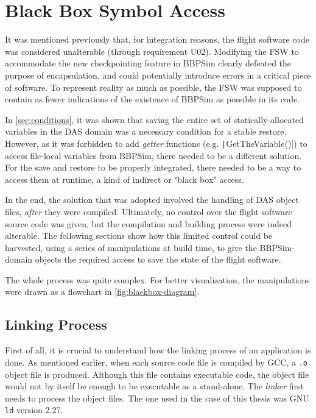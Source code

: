 {
\setlength{\parindent}{2em}
\section{Black Box Symbol Access}\label{sec:das-mem-restore}
It was mentioned previously that, for integration reasons, the flight software code was considered unalterable (through requirement U02). Modifying the \gls{FSW} to accommodate the new checkpointing feature in BBPSim clearly defeated the purpose of encapsulation, and could potentially introduce errors in a critical piece of software. To represent reality as much as possible, the FSW was supposed to contain as fewer indications of the existence of \gls{BBPSim} as possible in its code.

In \autoref{sec:conditions}, it was shown that saving the entire set of statically-allocated variables in the DAS domain was a necessary condition for a stable restore. However, as it was forbidden to add \textit{getter} functions (e.g. \texttt|GetTheVariable()|) to access file-local variables from BBPSim, there needed to be a different solution. For the save and restore to be properly integrated, there needed to be a way to access them at runtime, a kind of indirect or "black box" access. 

In the end, the solution that was adopted involved the handling of DAS object files, \textit{after} they were compiled. Ultimately, no control over the flight software source code was given, but the compilation and building process were indeed alterable. The following sections show how this limited control could be harvested, using a series of manipulations at build time, to give the \gls{BBPSim}-domain objects the required access to save the state of the flight software.

The whole process was quite complex. For better visualization, the manipulations were drawn as a flowchart in \autoref{fig:blackbox-diagram}.

\subsection*{Linking Process}
First of all, it is crucial to understand how the linking process of an application is done. As mentioned earlier, when each source code file is compiled by \gls{GCC}, a \texttt{.o} object file is produced. Although this file contains executable code, the object file would not by itself be enough to be executable as a stand-alone. The \textit{linker} first needs to process the object files. The one used in the case of this thesis was GNU \texttt{ld} version 2.27.

}

